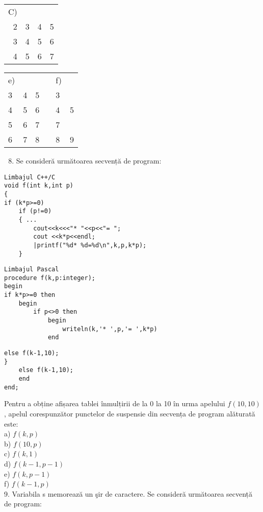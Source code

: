 \begin{center}
\begin{tabular}{rlll}
C) &  &  &  \\
2 & 3 & 4 & 5 \\
3 & 4 & 5 & 6 \\
4 & 5 & 6 & 7 \\
\end{tabular}
\end{center}

\begin{center}
\begin{tabular}{llllll}
e) &  &  &  & f) &  \\
3 & 4 & 5 &  & 3 &  \\
4 & 5 & 6 &  & 4 & 5 \\
5 & 6 & 7 &  & 7 &  \\
6 & 7 & 8 &  & 8 & 9 \\
\end{tabular}
\end{center}

\begin{enumerate}
  \setcounter{enumi}{7}
  \item Se consideră următoarea secvență de program:
\end{enumerate}

\begin{verbatim}
Limbajul C++/C
void f(int k,int p)
{
if (k*p>=0)
    if (p!=0)
    { ...
        cout<<k<<<"* "<<p<<"= ";
        cout <<k*p<<endl;
        |printf("%d* %d=%d\n",k,p,k*p);
    }
\end{verbatim}

\begin{verbatim}
Limbajul Pascal
procedure f(k,p:integer);
begin
if k*p>=0 then
    begin
        if p<>0 then
            begin
                writeln(k,'* ',p,'= ',k*p)
            end
\end{verbatim}

\begin{verbatim}
else f(k-1,10);
}
    else f(k-1,10);
    end
end;
\end{verbatim}

Pentru a obține afișarea tablei înmulțirii de la 0 la 10 în urma apelului $f(10,10)$, apelul corespunzător punctelor de suspensie din secvența de program alăturată este:\\
a) $f(k, p)$\\
b) $f(10, p)$\\
c) $f(k, 1)$\\
d) $f(k-1, p-1)$\\
e) $f(k, p-1)$\\
f) $f(k-1, p)$\\
9. Variabila s memorează un şir de caractere. Se consideră următoarea secvență de program:

